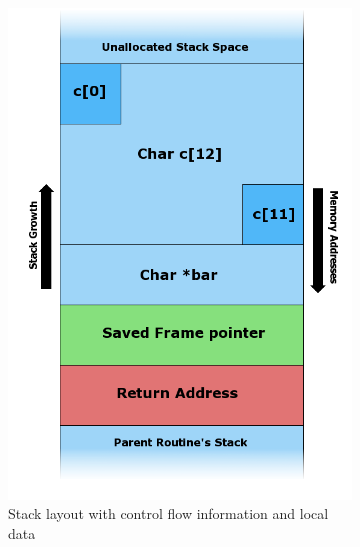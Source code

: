 \begin{figure}[htb]
	\centering
	\begin{subfigure}[t]{0.28\textwidth}
		\centering
		\includegraphics[height=0.25\textheight]{figures/Stack_Overflow_2}
		\caption{Stack layout with control flow information and local data \cite{Lynn2007}}
		\label{fig:stack-layout-without-data}
	\end{subfigure}
	\hfill
	\begin{subfigure}[t]{0.28\textwidth}
		\centering

\end{subfigure}
\end{figure}
